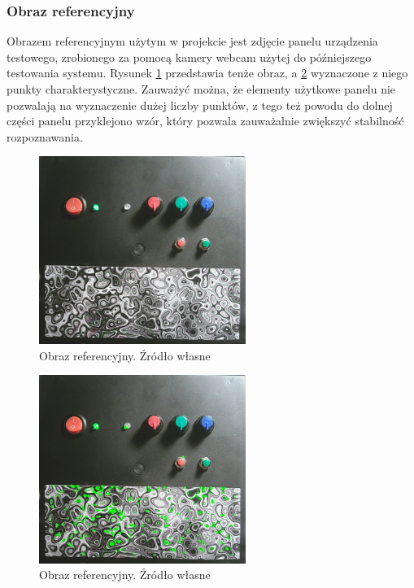 \documentclass[12pt,twoside,polish]{article}
\begin{document}
\subsubsection*{Obraz referencyjny}

Obrazem referencyjnym użytym w projekcie jest zdjęcie panelu urządzenia testowego, zrobionego za pomocą kamery webcam użytej do późniejszego testowania systemu. Rysunek \ref{base_img} przedstawia tenże obraz, a \ref{base_img_kp} wyznaczone z niego punkty charakterystyczne. Zauważyć można, że elementy użytkowe panelu nie pozwalają na wyznaczenie dużej liczby punktów, z tego też powodu do dolnej części panelu przyklejono wzór, który pozwala zauważalnie zwiększyć stabilność rozpoznawania.
\begin{figure}[h]
	\centering
	\includegraphics[width=0.6\textwidth]{base}
	\caption{Obraz referencyjny. Źródło własne}
	\label{base_img}
\end{figure}
\begin{figure}[h]
	\centering
	\includegraphics[width=0.6\textwidth]{base_kp}
	\caption{Obraz referencyjny. Źródło własne}
	\label{base_img_kp}
\end{figure}
\end{document}
